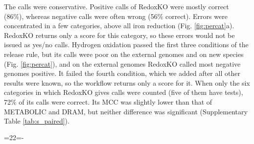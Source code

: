 \documentclass[10pt,a4paper,onecolumn]{article}
\begin{document}
The calls were conservative. Positive calls of RedoxKO were mostly
correct (86\%), whereas negative calls were often wrong (56\% correct).
Errors were concentrated in a few categories, above all iron reduction
(Fig. \ref{fig:percat}a). RedoxKO returns only a score for this
category, so these errors would not be issued as yes/no calls. Hydrogen
oxidation passed the first three conditions of the release rule, but its
calls were poor on the external genomes and on new species (Fig.
\ref{fig:percat}), and on the external genomes RedoxKO called most
negative genomes positive. It failed the fourth condition, which we
added after all other results were known, so the workflow returns only a
score for it. When only the six categories in which RedoxKO gives calls
were counted (five of them have tests), 72\% of its calls were correct.
Its MCC was slightly lower than that of METABOLIC and DRAM, but neither
difference was significant (Supplementary Table \ref{tab:s_paired}).

\par

\begingroup{}=22\baselineskip{}=\pagegoal\advance{}-\pagetotal\ifdim\dimen0>\dimen2\ifdim\dimen2>0pt\vfil\fi{}\fi\endgroup

\begingroup\small{}\renewcommand{\arraystretch}{1.25}
\end{document}
